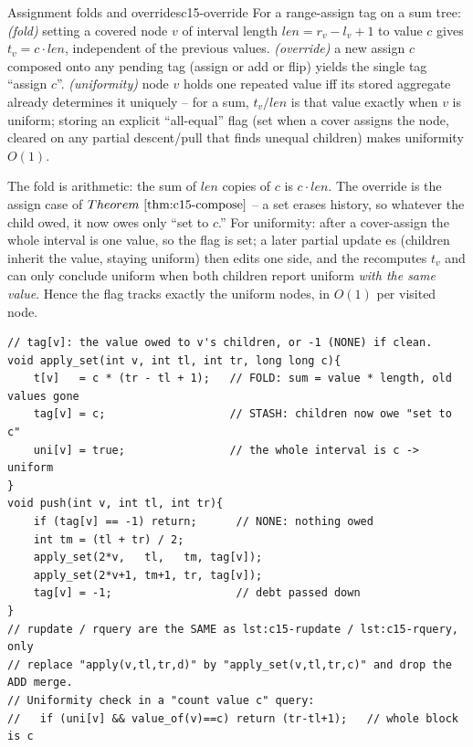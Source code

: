 \begin{proposition}{Assignment folds and overrides}{c15-override}
For a range-assign tag on a sum tree: \emph{(fold)} setting a covered node \(v\) of interval length \(\mathit{len}=r_v-l_v+1\) to value \(c\) gives \(t_v=c\cdot\mathit{len}\), independent of the previous values.  \emph{(override)} a new assign \(c\) composed onto any pending tag (assign or add or flip) yields the single tag ``assign \(c\)''.  \emph{(uniformity)} node \(v\) holds one repeated value iff its stored aggregate already determines it uniquely -- for a sum, \(t_v/\mathit{len}\) is that value exactly when \(v\) is uniform; storing an explicit ``all-equal'' flag (set when a cover assigns the node, cleared on any partial descent/pull that finds unequal children) makes uniformity \(O(1)\).
\end{proposition}
\begin{proofbox}
The fold is arithmetic: the sum of \(\mathit{len}\) copies of \(c\) is \(c\cdot\mathit{len}\).  The override is the assign case of \(\thmref{c15-compose}\) -- a set erases history, so whatever the child owed, it now owes only ``set to \(c\).''  For uniformity: after a cover-assign the whole interval is one value, so the flag is set; a later partial update es (children inherit the value, staying uniform) then edits one side, and the  recomputes \(t_v\) and can only conclude uniform when both children report uniform \emph{with the same value}.  Hence the flag tracks exactly the uniform nodes, in \(O(1)\) per visited node.
\end{proofbox}

\begin{lstlisting}[caption={range-assign tag: the fold is value*len, the merge is a plain overwrite}, label={lst:c15-assign}]
// tag[v]: the value owed to v's children, or -1 (NONE) if clean.
void apply_set(int v, int tl, int tr, long long c){
    t[v]   = c * (tr - tl + 1);   // FOLD: sum = value * length, old values gone
    tag[v] = c;                   // STASH: children now owe "set to c"
    uni[v] = true;                // the whole interval is c -> uniform
}
void push(int v, int tl, int tr){
    if (tag[v] == -1) return;      // NONE: nothing owed
    int tm = (tl + tr) / 2;
    apply_set(2*v,   tl,   tm, tag[v]);
    apply_set(2*v+1, tm+1, tr, tag[v]);
    tag[v] = -1;                   // debt passed down
}
// rupdate / rquery are the SAME as lst:c15-rupdate / lst:c15-rquery, only
// replace "apply(v,tl,tr,d)" by "apply_set(v,tl,tr,c)" and drop the ADD merge.
// Uniformity check in a "count value c" query:
//   if (uni[v] && value_of(v)==c) return (tr-tl+1);   // whole block is c
\end{lstlisting}

